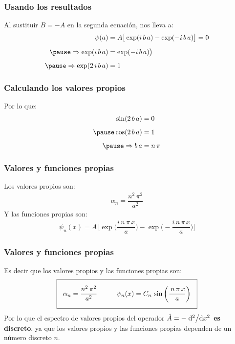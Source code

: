 \documentclass[12pt]{beamer}
\begin{document}
\begin{frame}
\frametitle{Usando los resultados}
Al sustituir $B = - A$ en la segunda ecuación, nos lleva a:
\pause
\begin{eqnarray*}
\begin{aligned}
\psi (a) &= A \big[ \exp (i \, b \, a) - \exp(- i \, b \, a) \big] = 0 \\[0.5em] \pause
\Rightarrow  \exp (i \, b \, a) &= \exp(- i \, b \, a) \big) \\[0.5em] \pause
\Rightarrow  \exp (2 \, i \, b \, a) &= 1
\end{aligned}
\end{eqnarray*}
\end{frame}
\begin{frame}
\frametitle{Calculando los valores propios}
Por lo que:
\pause
\begin{eqnarray*}
\begin{aligned}
\sin ( 2 \, b \, a) &= 0 \\[0.5em] \pause
\cos ( 2 \, b \, a) &= 1 \\[0.5em] \pause
\Rightarrow b \, a &= n \, \pi
\end{aligned}
\end{eqnarray*}
\end{frame}
\begin{frame}
\frametitle{Valores y funciones propias}
Los valores propios son:
\pause
\begin{align*}
\alpha_{n} = \dfrac{n^{2} \, \pi^{2}}{a^{2}}
\end{align*}
\pause
Y las funciones propias son:
\pause
\begin{align*}
\psi_{n}(x) = A \, \bigg[ \exp \bigg(\dfrac{i \, n \, \pi \, x}{a} \bigg) - \exp \bigg(- \dfrac{i \, n \, \pi \, x}{a} \bigg) \bigg]
\end{align*}
\end{frame}
\begin{frame}
\frametitle{Valores y funciones propias}
Es decir que los valores propios y las funciones propias son:
\pause
\begin{align*}
\setlength{\fboxsep}{3\fboxsep}\boxed{
\alpha_{n} = \dfrac{n^{2} \, \pi^{2}}{a^{2}} \hspace{1cm} \psi_{n}(x) = C_{n} \, \sin \bigg(\dfrac{\, n \, \pi \, x}{a} \bigg) }
\end{align*}
\pause
Por lo que el espectro de valores propios del operador $\hat{A} = - \dv*[2]{x}$ \textbf{es discreto}, ya que los valores propios y las funciones propias dependen de un número discreto $n$.
\end{frame}
\end{document}

